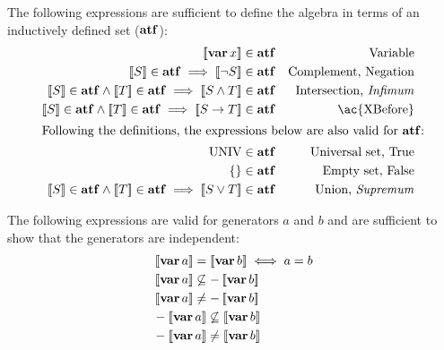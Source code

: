 \documentclass[12pt,openright,twoside,a4paper,oldfontcommands,english,brazil,final]{abntex2}
\theoremstyle{theo}
\def\varop{\ensuremath\operatorname{\mathbf{var}}}
\newcommand{\var}[1]{\ensuremath\varop #1}
\def\xbeforeop{\ensuremath\rightarrow}
\newcommand{\xbefore}[2]{\ensuremath #1 \xbeforeop #2 }
\def\True{\ensuremath\operatorname{UNIV}}
\def\False{\ensuremath\operatorname{\left\{\right\}}}
\def\algebraset{\ensuremath\mathbf{atf}}
\newcommand{\denote}[1]{\ensuremath\left[\!\left[#1\right]\!\right]}
\begin{document}
The following expressions are sufficient to define the \ac{algebra} in terms of an inductively defined set ($\algebraset$):
%
\begin{subequations}
\label{def:algebraset}
\begin{align}
\denote{\var x} & \in \algebraset & \text{Variable}\label{def:algebraset-var}\\
\denote{S} \in \algebraset \implies \denote{\lnot S} & \in \algebraset & \text{Complement, Negation}\label{def:algebraset-compl}\\
\denote{S} \in \algebraset \land \denote{T} \in \algebraset \implies \denote{S \land T} & \in \algebraset & \text{Intersection, \emph{Infimum}}\label{def:algebraset-inf}\\
\denote{S} \in \algebraset \land \denote{T} \in \algebraset \implies \denote{\xbefore{S}{T}} & \in \algebraset & \text{\ac{XBefore}}\label{def:algebraset-xbefore}\\
\intertext{Following the definitions, the expressions below are also valid for $\algebraset$:}
\True &\in \algebraset & \text{Universal set, True}\label{def:algebraset-true}\\
\False &\in \algebraset & \text{Empty set, False}\label{def:algebraset-false}\\
\denote{S} \in \algebraset \land \denote{T} \in \algebraset \implies \denote{S \lor T} &\in \algebraset & \text{Union, \emph{Supremum}}\label{def:algebraset-sup}
\end{align}
\end{subequations}

The following expressions are valid for generators $a$ and $b$ and are sufficient to show that the generators are independent:
%
\begin{subequations}
\label{eqs:generators-independence}
\begin{align}
&\denote{\var{a}} = \denote{\var{b}} \iff a = b\label{eqs:generators-independence-eq-eq}\\
&\denote{\var{a}} \not\subseteq - \denote{\var{b}}\\
&\denote{\var{a}} \neq -\denote{\var{b}}\label{eqs:generators-independence-subseteq-neq-compl} \\
&- \denote{\var{a}} \not\subseteq \denote{\var{b}}\\
&- \denote{\var{a}} \neq \denote{\var{b}}\label{eqs:generators-independence-subseteq-compl-neq}
\end{align}
\end{subequations}
\end{document}
